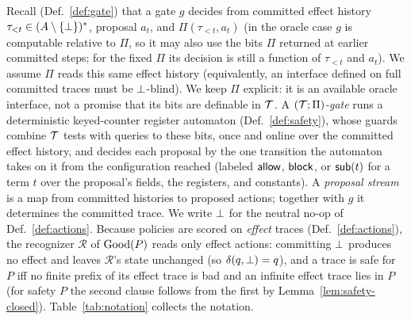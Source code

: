 Recall (Def.~\ref{def:gate}) that a gate $g$ decides from committed effect
history $\tau_{<t}\in(A\setminus\{\bot\})^{*}$, proposal $a_t$, and
$\Pi(\tau_{<t},a_t)$ (in the oracle case $g$ is computable relative to $\Pi$, so it may also use the bits $\Pi$ returned at earlier committed steps; for the fixed $\Pi$ its decision is still a function of $\tau_{<t}$ and $a_t$). We assume $\Pi$ reads this same effect history (equivalently,
an interface defined on full committed traces must be $\bot$-blind).
We keep $\Pi$ explicit: it is an available oracle interface,
not a promise that its bits are definable in $\mathcal{T}$. A
\emph{$(\mathcal{T};\Pi)$-gate} runs a deterministic keyed-counter register automaton (Def.~\ref{def:safety}), whose
guards combine $\mathcal{T}$ tests with queries to these bits, once and online over the committed effect history, and decides each
proposal by the one transition the automaton takes on it from the configuration reached (labeled $\mathsf{allow}$, $\mathsf{block}$, or
$\mathsf{sub}(t)$ for a term $t$ over the proposal's fields, the registers, and constants). A
\emph{proposal stream} is a map from committed histories to proposed actions;
together with $g$ it determines the committed trace. We write $\bot$ for the
neutral no-op of Def.~\ref{def:actions}. Because policies are scored on \emph{effect}
traces (Def.~\ref{def:actions}), the recognizer $\mathcal R$ of $\mathrm{Good}(P)$ reads only
effect actions: committing $\bot$ produces no effect and leaves $\mathcal R$'s state
unchanged (so $\delta(q,\bot)=q$), and a trace is safe for $P$ iff no finite prefix of
its effect trace is bad and an infinite effect trace lies in $P$ (for safety $P$ the
second clause follows from the first by Lemma~\ref{lem:safety-closed}). Table~\ref{tab:notation} collects the notation.

